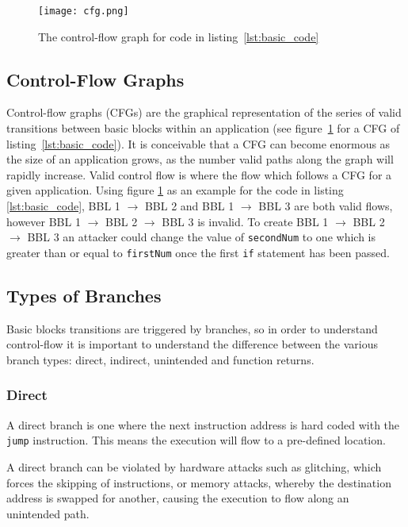 \begin{figure}
  \centering
  \vspace*{0.5in}
  \texttt{[image: cfg.png]}
  \caption{The control-flow graph for code in listing~\ref{lst:basic_code}}
  \label{fig:basicCFG}
\end{figure}

\subsection{Control-Flow Graphs}
Control-flow graphs (CFGs) are the graphical representation of the series of valid transitions between basic blocks within an application (see figure~\ref{fig:basicCFG} for a CFG of listing~\ref{lst:basic_code}). It is conceivable that a CFG can become enormous as the size of an application grows, as the number valid paths along the graph will rapidly increase. Valid control flow is where the flow which follows a CFG for a given application. Using figure \ref{fig:basicCFG} as an example for the code in listing \ref{lst:basic_code}, BBL 1 $\rightarrow$ BBL 2 and BBL 1 $\rightarrow$ BBL 3 are both valid flows, however BBL 1 $\rightarrow$ BBL 2 $\rightarrow$ BBL 3 is invalid. To create BBL 1 $\rightarrow$ BBL 2 $\rightarrow$ BBL 3 an attacker could change the value of \verb|secondNum| to one which is greater than or equal to \verb|firstNum| once the first \verb|if| statement has been passed. 

\subsection{Types of Branches}
Basic blocks transitions are triggered by branches, so in order to understand control-flow it is important to understand the difference between the various branch types: direct, indirect, unintended and function returns.

\subsubsection*{Direct}
A direct branch is one where the next instruction address is hard coded with the \verb|jump| instruction. This means the execution will flow to a pre-defined location.

A direct branch can be violated by hardware attacks such as glitching, which forces the skipping of instructions, or memory attacks, whereby the destination address is swapped for another, causing the execution to flow along an unintended path.

